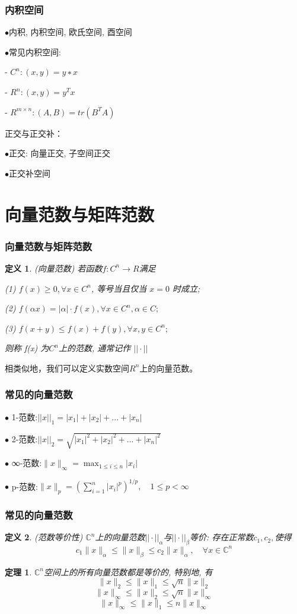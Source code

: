 \documentclass[notheorems,serif]{beamer}
\newcommand{\hei}[1]{{\HEI#1}}
\newtheorem{theorem}{\hei{定理}}
\newtheorem{definition}{\hei{定义}}
\begin{document}
\begin{frame}
\frametitle{内积空间}
\qquad$\bullet$内积, 内积空间, 欧氏空间, 酉空间
 
\qquad$\bullet$常见内积空间:
 
 \qquad\qquad - $C^{n} : (x, y) = y∗x$
 
 \qquad\qquad - $R^{n} : (x, y) = y^{T}x$
 
 \qquad\qquad - $R^{m \times n} : (A, B) = tr(B^{T}A)$
 
 正交与正交补：
 
\qquad$\bullet$正交: 向量正交, 子空间正交
 
\qquad$\bullet$正交补空间
\end{frame}

\section{向量范数与矩阵范数}
\begin{frame}
\frametitle{向量范数与矩阵范数}
\begin{definition}(向量范数)
	若函数$f : C^n \to R $满足
	
	(1) $f(x) \geq 0, ∀ x \in C^n$, 等号当且仅当 $x = 0$ 时成立;
	
	(2) $f(\alpha x) = |\alpha| · f(x), ∀ x \in C^{n}, α \in C;$
	
	(3) $f(x + y) \leq f(x) + f(y), ∀x, y \in C^{n};$
	
	则称 f(x) 为$C^{n}$上的范数, 通常记作 $|| \cdot ||$
\end{definition}

相类似地，我们可以定义实数空间$R^n$上的向量范数。
\end{frame}

\begin{frame}

\frametitle{常见的向量范数}
$\bullet$ 1-范数:$||x||_1=|x_1|+|x_2|+...+|x_n|$

$\bullet$ 2-范数:$||x||_2=\sqrt{|x_1|^2+|x_2|^2+...+|x_n|^2}$

$\bullet$ ∞-范数:$\|x\|_{\infty}=\max _{1 \leq i \leq n}\left|x_{i}\right|$

$\bullet$ p-范数:$\|x\|_{p}=\left(\sum_{i=1}^{n}\left|x_{i}\right|^{p}\right)^{1 / p}, \quad 1 \leq p<\infty$
\end{frame}

\begin{frame}
\frametitle{常见的向量范数}
\begin{definition}(范数等价性)
	$\mathbb{C}^{n}$上的向量范数$||\cdot||_{\alpha}$与$||\cdot||_{\beta}$等价: 存在正常数$c_1, c_2,$使得
	$$c_{1}\|x\|_{\alpha} \leq\|x\|_{\beta} \leq c_{2}\|x\|_{\alpha}, \quad \forall x \in \mathbb{C}^{n}$$
\end{definition}

\begin{theorem}
	$\mathbb{C}^{n}$空间上的所有向量范数都是等价的, 特别地, 有
	$$
	\|x\|_{2} \leq\|x\|_{1} \leq \sqrt{n}\|x\|_{2}
	$$
	$$
	\|x\|_{\infty} \leq\|x\|_{2} \leq \sqrt{n}\|x\|_{\infty}
	$$
	$$
	\|x\|_{\infty} \leq\|x\|_{1} \leq n\|x\|_{\infty}
	$$
\end{theorem}
\end{frame}
\end{document}
